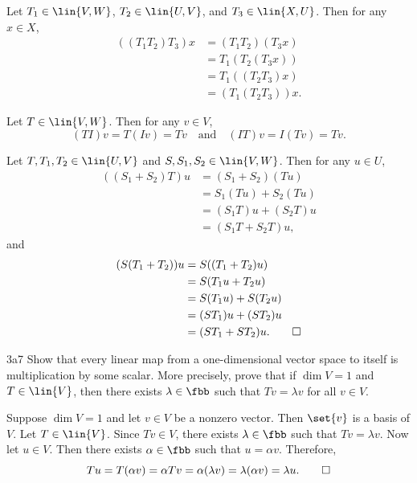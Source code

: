 \begin{solenum}
    \item Let $T_1 \in \lin{V, W}$, $T_2 \in \lin{U, V}$, and $T_3 \in \lin{X, U}$.
	Then for any $x \in X$,
    \begin{align*}
        ((T_1T_2)T_3)x & = (T_1T_2)(T_3x) \\
        & = T_1(T_2(T_3x)) \\
        & = T_1((T_2T_3)x) \\
        & = (T_1(T_2T_3))x.
    \end{align*}
    \item Let $T \in \lin{V, W}$.
	Then for any $v \in V$,
    \[
    	(TI)v = T(Iv) = Tv \quad \text{and} \quad (IT)v = I(Tv) = Tv.
    \]
    \item Let $T, T_1, T_2 \in \lin{U, V}$ and $S, S_1, S_2 \in \lin{V, W}$.
	Then for any $u \in U$,
    \begin{align*}
        ((S_1 + S_2)T)u & = (S_1 + S_2)(Tu) \\
        & = S_1(Tu) + S_2(Tu) \\
        & = (S_1T)u + (S_2T)u \\
        & = (S_1T + S_2T)u,
    \end{align*}
    and
    \begin{align*}
        (S(T_1 + T_2))u & = S((T_1 + T_2)u) \\
        & = S(T_1u + T_2u) \\
        & = S(T_1u) + S(T_2u) \\
        & = (ST_1)u + (ST_2)u \\
        & = (ST_1 + ST_2)u. \qedhere
    \end{align*}
\end{solenum}

\begin{exercise}{3a7}
    Show that every linear map from a one-dimensional vector space to itself is multiplication by some scalar.
	More precisely, prove that if $\dim V = 1$ and $T \in \lin{V}$, then there exists $\lambda \in \fbb$ such that $Tv = \lambda v$ for all $v \in V$.
\end{exercise}

\begin{sol}
    Suppose $\dim V = 1$ and let $v \in V$ be a nonzero vector.
	Then $\set{v}$ is a basis of $V$.
	Let $T \in \lin{V}$.
	Since $Tv \in V$, there exists $\lambda \in \fbb$ such that $Tv = \lambda v$.
	Now let $u \in V$.
	Then there exists $\alpha \in \fbb$ such that $u = \alpha v$.
	Therefore,
    \[
    	Tu = T(\alpha v) = \alpha Tv = \alpha (\lambda v) = \lambda (\alpha v) = \lambda u. \qedhere
    \]
\end{sol}

